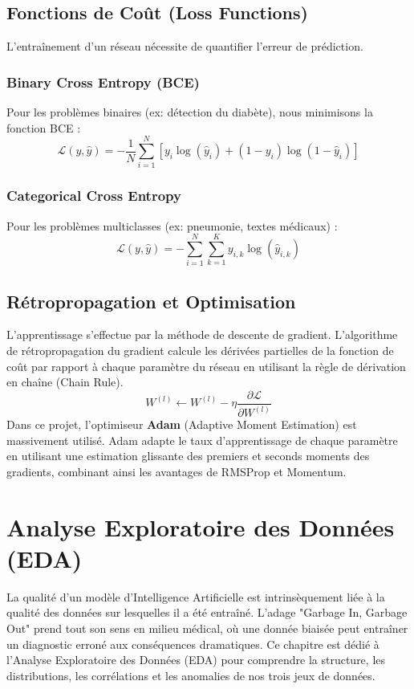\documentclass[a4paper,12pt]{report}
\begin{document}
\section{Fonctions de Coût (Loss Functions)}
L'entraînement d'un réseau nécessite de quantifier l'erreur de prédiction. 
\subsection{Binary Cross Entropy (BCE)}
Pour les problèmes binaires (ex: détection du diabète), nous minimisons la fonction BCE :
\begin{equation}
\mathcal{L}(y, \hat{y}) = -\frac{1}{N} \sum_{i=1}^{N} \left[ y_i \log(\hat{y}_i) + (1 - y_i) \log(1 - \hat{y}_i) \right]
\end{equation}
\subsection{Categorical Cross Entropy}
Pour les problèmes multiclasses (ex: pneumonie, textes médicaux) :
\begin{equation}
\mathcal{L}(y, \hat{y}) = -\sum_{i=1}^{N} \sum_{k=1}^{K} y_{i,k} \log(\hat{y}_{i,k})
\end{equation}

\section{Rétropropagation et Optimisation}
L'apprentissage s'effectue par la méthode de descente de gradient. L'algorithme de rétropropagation du gradient calcule les dérivées partielles de la fonction de coût par rapport à chaque paramètre du réseau en utilisant la règle de dérivation en chaîne (Chain Rule).
\begin{equation}
W^{(l)} \leftarrow W^{(l)} - \eta \frac{\partial \mathcal{L}}{\partial W^{(l)}}
\end{equation}
Dans ce projet, l'optimiseur \textbf{Adam} (Adaptive Moment Estimation) est massivement utilisé. Adam adapte le taux d'apprentissage de chaque paramètre en utilisant une estimation glissante des premiers et seconds moments des gradients, combinant ainsi les avantages de RMSProp et Momentum.
\chapter{Analyse Exploratoire des Données (EDA)}

La qualité d'un modèle d'Intelligence Artificielle est intrinsèquement liée à la qualité des données sur lesquelles il a été entraîné. L'adage "Garbage In, Garbage Out" prend tout son sens en milieu médical, où une donnée biaisée peut entraîner un diagnostic erroné aux conséquences dramatiques. Ce chapitre est dédié à l'Analyse Exploratoire des Données (EDA) pour comprendre la structure, les distributions, les corrélations et les anomalies de nos trois jeux de données.
\end{document}
